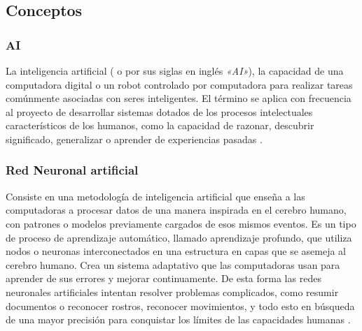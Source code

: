 \subsection{Conceptos}
\subsubsection{AI}
La inteligencia artificial ( o por sus siglas en inglés \textit{«AI»}), la capacidad de una computadora digital o un robot controlado por computadora para realizar tareas comúnmente asociadas con seres inteligentes. El término se aplica con frecuencia al proyecto de desarrollar sistemas dotados de los procesos intelectuales característicos de los humanos, como la capacidad de razonar, descubrir significado, generalizar o aprender de experiencias pasadas \cite{AI}.
\subsubsection{Red Neuronal artificial}
Consiste en una metodología de inteligencia artificial que enseña a las computadoras a procesar datos de una manera inspirada en el cerebro humano, con patrones o modelos previamente cargados de esos mismos eventos. Es un tipo de proceso de aprendizaje automático, llamado aprendizaje profundo, que utiliza nodos o neuronas interconectados en una estructura en capas que se asemeja al cerebro humano. Crea un sistema adaptativo que las computadoras usan para aprender de sus errores y mejorar continuamente. De esta forma las redes neuronales artificiales intentan resolver problemas complicados, como resumir documentos o reconocer rostros, reconocer movimientos, y todo esto en búsqueda de una mayor precisión para conquistar los límites de las capacidades humanas \cite{ANN}.







